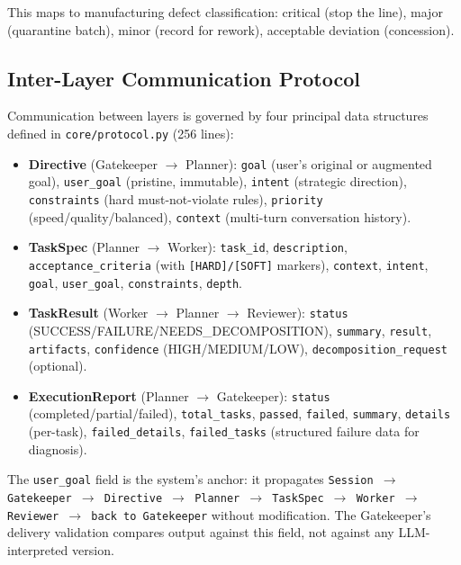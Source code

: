\documentclass[11pt,a4paper]{article}
\begin{document}
This maps to manufacturing defect classification: critical (stop the line),
major (quarantine batch), minor (record for rework), acceptable deviation
(concession).

\subsection{Inter-Layer Communication Protocol}
\label{sec:protocol}

Communication between layers is governed by four principal data structures
defined in \texttt{core/protocol.py} (256 lines):

\begin{itemize}[leftmargin=*,itemsep=2pt]
    \item \textbf{Directive} (Gatekeeper $\rightarrow$ Planner):
    \texttt{goal} (user's original or augmented goal),
    \texttt{user\_goal} (pristine, immutable),
    \texttt{intent} (strategic direction),
    \texttt{constraints} (hard must-not-violate rules),
    \texttt{priority} (speed/quality/balanced),
    \texttt{context} (multi-turn conversation history).

    \item \textbf{TaskSpec} (Planner $\rightarrow$ Worker):
    \texttt{task\_id}, \texttt{description}, \texttt{acceptance\_criteria}
    (with \texttt{[HARD]/[SOFT]} markers), \texttt{context}, \texttt{intent},
    \texttt{goal}, \texttt{user\_goal}, \texttt{constraints}, \texttt{depth}.

    \item \textbf{TaskResult} (Worker $\rightarrow$ Planner $\rightarrow$
    Reviewer):
    \texttt{status} (SUCCESS/FAILURE/NEEDS\_DECOMPOSITION),
    \texttt{summary}, \texttt{result}, \texttt{artifacts}, \texttt{confidence}
    (HIGH/MEDIUM/LOW), \texttt{decomposition\_request} (optional).

    \item \textbf{ExecutionReport} (Planner $\rightarrow$ Gatekeeper):
    \texttt{status} (completed/partial/failed),
    \texttt{total\_tasks}, \texttt{passed}, \texttt{failed},
    \texttt{summary}, \texttt{details} (per-task), \texttt{failed\_details},
    \texttt{failed\_tasks} (structured failure data for diagnosis).
\end{itemize}

The \texttt{user\_goal} field is the system's anchor: it propagates
\texttt{Session $\rightarrow$ Gatekeeper $\rightarrow$ Directive $\rightarrow$
Planner $\rightarrow$ TaskSpec $\rightarrow$ Worker $\rightarrow$ Reviewer
$\rightarrow$ back to Gatekeeper} without modification. The Gatekeeper's
delivery validation compares output against this field, not against any
LLM-interpreted version.
\end{document}
